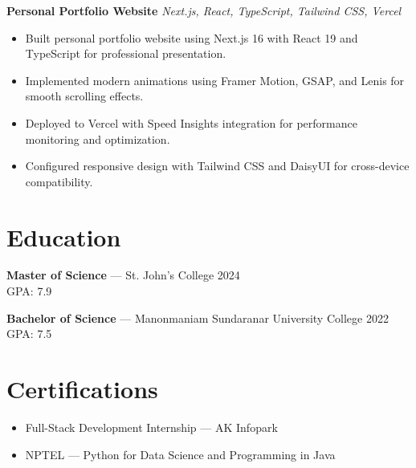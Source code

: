 \documentclass[letterpaper,10pt]{article}
\newcommand{\resumeItem}[1]{\item \small{#1}}
\newcommand{\resumeItemListStart}{\begin{itemize}[leftmargin=*, noitemsep, label={\color{accent}\textbullet}]}
\newcommand{\resumeItemListEnd}{\end{itemize}}
\begin{document}
\textbf{Personal Portfolio Website}
\textit{\color{muted}Next.js, React, TypeScript, Tailwind CSS, Vercel}
\resumeItemListStart
\resumeItem{Built personal portfolio website using Next.js 16 with React 19 and TypeScript for professional presentation.}
\resumeItem{Implemented modern animations using Framer Motion, GSAP, and Lenis for smooth scrolling effects.}
\resumeItem{Deployed to Vercel with Speed Insights integration for performance monitoring and optimization.}
\resumeItem{Configured responsive design with Tailwind CSS and DaisyUI for cross-device compatibility.}
\resumeItemListEnd

\section{Education}

\textbf{Master of Science} — St. John's College \hfill {\color{muted}2024} \\
{\color{muted}GPA: 7.9}

\textbf{Bachelor of Science} — Manonmaniam Sundaranar University College \hfill {\color{muted}2022} \\
{\color{muted}GPA: 7.5}

\section{Certifications}

\resumeItemListStart
\resumeItem{Full-Stack Development Internship — AK Infopark}
\resumeItem{NPTEL — Python for Data Science and Programming in Java}
\resumeItemListEnd
\end{document}
